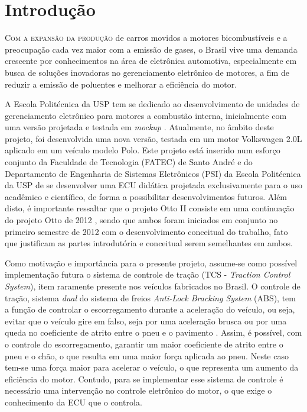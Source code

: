 
\newpage
\chapter{Introdução}
\label{chp: Introdução}

\lettrine{C}{om a expansão da produção} de carros movidos a motores bicombustíveis e a preocupação cada vez maior com a emissão de gases, o Brasil vive uma demanda crescente por conhecimentos na área de eletrônica automotiva, especialmente em busca de soluções inovadoras no gerenciamento eletrônico de motores, a fim de reduzir a emissão de poluentes e melhorar a eficiência do motor.

	A Escola Politécnica da USP tem se dedicado ao desenvolvimento de unidades de gerenciamento eletrônico para motores a combustão interna, inicialmente com uma versão projetada e testada em \textit{mockup} \cite{andre2012}. Atualmente, no âmbito deste projeto, foi desenvolvida uma nova versão, testada em um motor Volkswagen 2.0L aplicado em um veículo modelo Polo. Este projeto está inserido num esforço conjunto da Faculdade de Tecnologia (FATEC) de Santo André e do Departamento de Engenharia de Sistemas Eletrônicos (PSI) da Escola Politécnica da USP de se desenvolver uma ECU didática projetada exclusivamente para o uso acadêmico e científico, de forma a possibilitar desenvolvimentos futuros. Além disto, é importante ressaltar que o projeto Otto II consiste em uma continuação do projeto Otto de 2012 \cite{andre2012}, sendo que ambos foram iniciados em conjunto no primeiro semestre de 2012 com o desenvolvimento conceitual do trabalho, fato que justificam as partes introdutória e conceitual serem semelhantes em ambos.
	
	Como motivação e importância para o presente projeto, assume-se como possível implementação futura o sistema de controle de tração (TCS - \textit{Traction Control System}), item raramente presente nos veículos fabricados no Brasil. O controle de tração, sistema \textit{dual} do sistema de freios \textit{Anti-Lock Bracking System} (ABS), tem a função de controlar o escorregamento durante a aceleração do veículo, ou seja, evitar que o veículo gire em falso, seja por uma aceleração brusca ou por uma queda no coeficiente de atrito entre o pneu e o pavimento \cite{bosch2005manual} . Assim, é possível, com o controle do escorregamento, garantir um maior coeficiente de atrito entre o pneu e o chão, o que resulta em uma maior força aplicada ao pneu. Neste caso tem-se uma força maior para acelerar o veículo, o que representa um aumento da eficiência do motor. Contudo, para se implementar esse sistema de controle é necessário uma intervenção no controle eletrônico do motor, o que exige o conhecimento da ECU que o controla.
	

